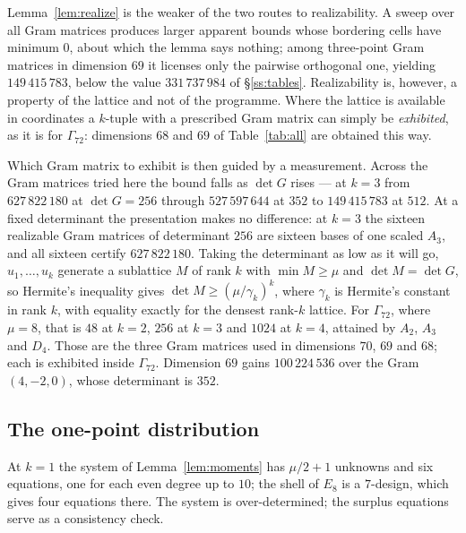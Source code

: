 \documentclass[11pt]{amsart}
\theoremstyle{remark}
\newcommand{\Gsz}{\Gamma_{72}}
\begin{document}
Lemma~\ref{lem:realize} is the weaker of the two routes to realizability. A sweep
over all Gram matrices produces larger apparent bounds whose bordering cells have
minimum $0$, about which the lemma says nothing; among three-point Gram matrices
in dimension $69$ it licenses only the pairwise orthogonal one, yielding
$149\,415\,783$, below the value $331\,737\,984$ of \S\ref{ss:tables}.
Realizability is, however, a property of the lattice and not of the programme.
Where the lattice is available in coordinates a $k$-tuple with a prescribed Gram
matrix can simply be \emph{exhibited}, as it is for $\Gsz$: dimensions $68$ and
$69$ of Table~\ref{tab:all} are obtained this way.

Which Gram matrix to exhibit is then guided by a measurement. Across the
Gram matrices tried here the bound falls as $\det G$ rises --- at $k=3$ from
$627\,822\,180$ at $\det G=256$ through $527\,597\,644$ at $352$ to
$149\,415\,783$ at $512$. At a fixed determinant the
presentation makes no difference: at $k=3$ the sixteen realizable Gram matrices of determinant
$256$ are sixteen bases of one scaled $A_3$, and all sixteen certify $627\,822\,180$. Taking the
determinant as low as it will go, $u_1,\dots,u_k$ generate a sublattice $M$ of rank $k$ with
$\min M\ge\mu$ and $\det M=\det G$, so Hermite's inequality gives
$\det M\ge(\mu/\gamma_k)^k$, where $\gamma_k$ is Hermite's constant in rank $k$,
with equality exactly for the densest rank-$k$ lattice. For $\Gsz$, where
$\mu=8$, that is $48$ at $k=2$, $256$ at $k=3$ and $1024$ at $k=4$, attained by
$A_2$, $A_3$ and $D_4$. Those are the three Gram matrices used in dimensions
$70$, $69$ and $68$; each is exhibited inside $\Gsz$. Dimension $69$ gains $100\,224\,536$ over
the Gram $(4,-2,0)$, whose determinant is $352$.

\subsection{The one-point distribution}\label{ss:onepoint}

At $k=1$ the system of Lemma~\ref{lem:moments} has $\mu/2+1$ unknowns and six
equations, one for each even degree up to $10$; the shell of $E_8$ is a
$7$-design, which gives four equations there. The system is over-determined; the
surplus equations serve as a consistency check.
\end{document}
